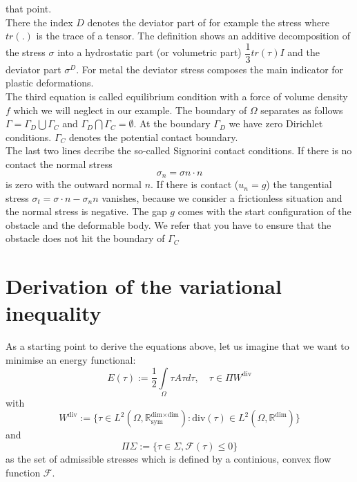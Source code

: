 \documentclass{article}
\begin{document}
that point.\\
There the index $D$ denotes the deviator part of for example the stress where
$tr(.)$ is the trace of a tensor. The definition shows an additive decomposition
of the stress $\sigma$ into a hydrostatic part (or volumetric part) $\dfrac{1}{3}tr(\tau)I$ and the deviator
part $\sigma^D$. For metal the deviator stress composes the main indicator for
plastic deformations.\\
The third equation is called equilibrium condition with a force of volume
density $f$ which we will neglect in our example.
The boundary of $\Omega$ separates as follows $\Gamma=\Gamma_D\bigcup\Gamma_C$ and $\Gamma_D\bigcap\Gamma_C=\emptyset$.
At the boundary $\Gamma_D$ we have zero Dirichlet conditions. $\Gamma_C$ denotes the potential contact boundary.\\
The last two lines decribe the so-called Signorini contact conditions. If there is no contact the normal  stress
$$ \sigma_n =  \sigma n\cdot n$$
is zero with the outward normal $n$. If there is contact ($u_n = g$) the tangential stress $\sigma_t = \sigma\cdot n - \sigma_n n$
vanishes, because we consider a frictionless situation and the normal stress is
negative. The gap $g$ comes with the start configuration of the obstacle and the
deformable body. We refer that you have to ensure that the obstacle does not hit
the boundary of $\Gamma_C$ 

\section{Derivation of the variational inequality}

As a starting point to derive the equations above, let us imagine that we want
to minimise an energy functional:
$$E(\tau) := \dfrac{1}{2}\int\limits_{\Omega}\tau A \tau d\tau,\quad \tau\in \Pi W^{\textrm{div}}$$
with
$$W^{\textrm{div}}:=\lbrace \tau\in
L^2(\Omega,\mathbb{R}^{\textrm{dim}\times\textrm{dim}}_{\textrm{sym}}):\textrm{div}(\tau)\in L^2(\Omega,\mathbb{R}^{\textrm{dim}})\rbrace$$ and
$$\Pi \Sigma:=\lbrace \tau\in \Sigma, \mathcal{F}(\tau)\leq 0\rbrace$$
as the set of admissible stresses which is defined
by a continious, convex flow function $\mathcal{F}$.
\end{document}
